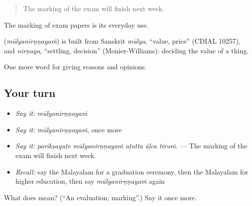 \begin{quote}
The marking of the exam will finish next week.
\end{quote}

The marking of exam papers is its everyday use.

\begin{cousinweb}
\textbf{} (\emph{mūlyanirṇṇayaṁ}) is built from Sanskrit \emph{mūlya}, \textquotedblleft{}value, price\textquotedblright{} (CDIAL 10257), and \emph{nirṇaya}, \textquotedblleft{}settling, decision\textquotedblright{} (Monier-Williams): deciding the value of a thing.
\end{cousinweb}

\begin{grammarlens}[title={What you've built}]
One more word for giving reasons and opinions.
\end{grammarlens}

\subsection*{Your turn}
\begin{itemize}
\raggedright
  \item \emph{Say it:} \emph{mūlyanirṇṇayaṁ}
  \item \emph{Say it:} \emph{mūlyanirṇṇayaṁ}, once more
  \item \emph{Say it:} \emph{parīkṣayuṭe mūlyanirṇṇayaṁ aṭutta āḻca tīruṁ.} — The marking of the exam will finish next week.
  \item \emph{Recall:} say the Malayalam for a graduation ceremony, then the Malayalam for higher education, then say \emph{mūlyanirṇṇayaṁ} again
\end{itemize}

\begin{tcolorbox}[breakable,colback=teal!4,colframe=teal!35!black,title={Before you move on}]
What does  mean? (\textquotedblleft{}An evaluation; marking\textquotedblright{}.) Say it once more.
\end{tcolorbox}
